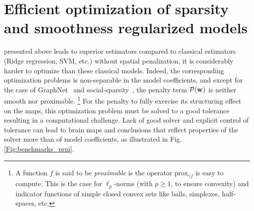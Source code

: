 \chapter{Efficient optimization of sparsity and smoothness regularized models}\label{chap:efficient_opt}
 presented above leads to superior estimators compared to classical estimators (Ridge regression, SVM, etc.) without spatial penalization, it is considerably harder to optimize than these classical models. Indeed, the corresponding optimization problems is non-separable in the model coefficients, and except for the case of GraphNet~\citep{hebiri2011,grosenick2013} and social-sparsity~\citep{kowalski2013social,varoquaux2016social},
the penalty term $\mathcal P(\mathbf{w})$ is neither smooth nor proximable.
\footnote{ A function $f$ is said to be \textit{proximable} is the operator $\text{prox}_{\gamma f}$ is easy to compute. This is the case for $\ell_p$-norms  (with $ p \ge 1$, to ensure convexity) and indicator functions of simple closed convex sets like balls, simplexes, half-spaces, etc.}
For the penalty to fully exercise its
structuring effect on the maps, this optimization problem must be
solved to a good tolerance resulting in a computational challenge. Lack of good solver and explicit control of
tolerance can lead to brain maps and conclusions that reflect
properties of the solver more than of model coefficients, as illustrated in Fig. \ref{Fig:benchmarks_prni}.

  

